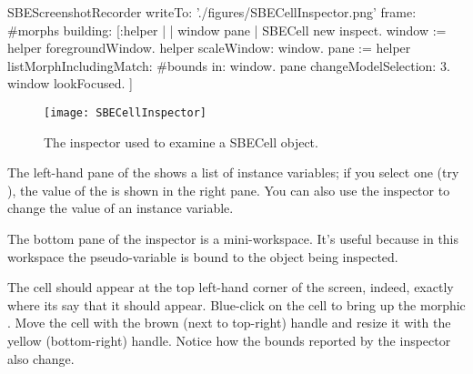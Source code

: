 \documentclass[a4paper,10pt,twoside]{book}
\begin{document}
\begin{ExecuteSmalltalkScript}
SBEScreenshotRecorder writeTo: './figures/SBECellInspector.png' frame: #morphs building: [:helper |
	| window pane |
	SBECell new inspect.
	window := helper foregroundWindow.
	helper scaleWindow: window.
	pane := helper listMorphIncludingMatch: #bounds in: window.
	pane changeModelSelection: 3.
	window lookFocused.
]
\end{ExecuteSmalltalkScript}
\begin{figure}[htbp]
   \centering
   \texttt{[image: SBECellInspector]}
   \caption{The inspector used to examine a SBECell object.\label{fig:SBECellInspector}}
\end{figure}

The left-hand pane of the  shows a list of instance variables; if you select one (try \mbox{),} the value of the  is shown in the right pane.
You can also use the inspector to change the value of an instance variable.


The bottom pane of the inspector is a mini-workspace.
It's useful because in this workspace the pseudo-variable \self is bound to the object being inspected.

The cell should appear at the top left-hand corner of the screen, indeed, exactly where its  say that it should appear.
Blue-click on the cell to bring up the morphic .
Move the cell with the brown (next to top-right) handle and resize it with the yellow (bottom-right) handle.
Notice how the bounds reported by the inspector also change.
\end{document}
